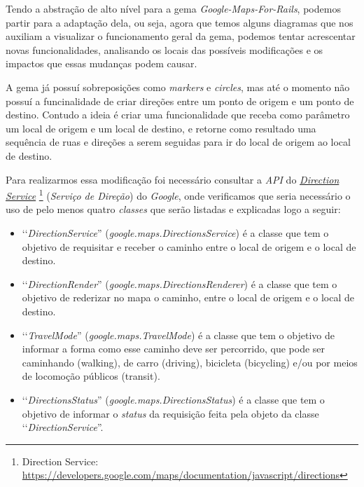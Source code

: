 Tendo a abstração de alto nível para a gema \emph{Google-Maps-For-Rails}, podemos partir para a 
adaptação dela, ou seja, agora que temos alguns diagramas que nos auxiliam a visualizar o funcionamento 
geral da gema, podemos tentar acrescentar novas funcionalidades, analisando os locais das possíveis 
modificações e os impactos que essas mudanças podem causar. 

A gema já possuí sobreposições como \emph{markers} e \emph{circles}, mas até o momento não possuí a 
funcinalidade de criar direções entre um ponto de origem e um ponto de destino. Contudo a ideia é criar 
uma funcionalidade que receba como parâmetro um local de origem e um local de destino, e retorne como
resultado uma sequência de ruas e direções a serem seguidas para ir do local de origem ao local de destino.

Para realizarmos essa modificação foi necessário consultar a \emph{API} do 
\emph{\href{https://developers.google.com/maps/documentation/javascript/directions}{Direction Service}} 
\footnote{Direction Service: \url{https://developers.google.com/maps/documentation/javascript/directions}}
(\emph{Serviço de Direção}) do \emph{Google}, onde verificamos que seria necessário o uso de pelo menos
quatro \emph{classes} que serão listadas e explicadas logo a seguir:

\begin{itemize}

 \item ‘‘\emph{DirectionService}'' (\emph{google.maps.DirectionsService}) é a classe que tem o 
 objetivo de requisitar e receber o caminho entre o local de origem e o local de destino.
 
 \item ‘‘\emph{DirectionRender}'' (\emph{google.maps.DirectionsRenderer}) é a classe que tem o 
 objetivo de rederizar no mapa o caminho, entre o local de origem e o local de destino.
 
 \item ‘‘\emph{TravelMode}'' (\emph{google.maps.TravelMode}) é a classe que tem o objetivo de 
 informar a forma como esse caminho deve ser percorrido, que pode ser caminhando (walking), de carro 
 (driving), bicicleta (bicycling) e/ou por meios de locomoção públicos (transit).
 
 \item ‘‘\emph{DirectionsStatus}'' (\emph{google.maps.DirectionsStatus}) é a classe que tem o
 objetivo de informar o \emph{status} da requisição feita pela objeto da classe
 ‘‘\emph{DirectionService}''.
 
\end{itemize}

